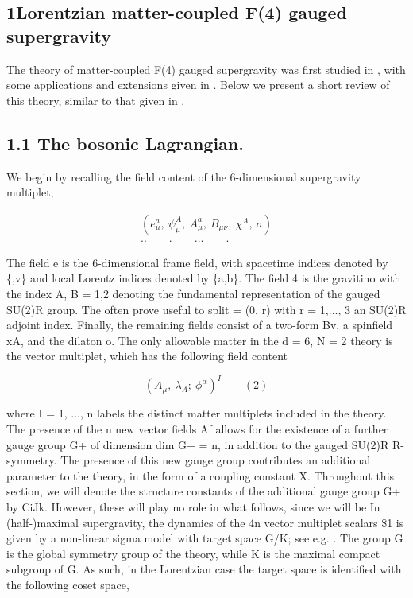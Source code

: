 \documentclass{article}
\begin{document}
\sloppy

\subsection*{1Lorentzian matter-coupled F(4) gauged supergravity}


The theory of matter-coupled F(4) gauged supergravity was first studied in , with some
applications and extensions given in . Below we present a short review of this theory, similar
to that given in .


\subsection*{1.1 The bosonic Lagrangian.}


We begin by recalling the field content of the 6-dimensional supergravity multiplet,


\begin{equation}
\begin{array} { c } { ( e _ { \mu } ^ { a }, ~ \psi _ { \mu } ^ { A }, ~ A _ { \mu } ^ { a }, ~ B _ { \mu \nu }, ~ \chi ^ { A }, ~ \sigma ) } \\ {.. \qquad. \qquad \dots \qquad. } \end{array}
\end{equation}


The field e is the 6-dimensional frame field, with spacetime indices denoted by \{,v\}
and local Lorentz indices denoted by \{a,b\}. The field 4 is the gravitino with the index
A, B = 1,2 denoting the fundamental representation of the gauged SU(2)R group. The
often prove useful to split  = (0, r) with r = 1,..., 3 an SU(2)R adjoint index. Finally, the
remaining fields consist of a two-form Bv, a spinfield xA, and the dilaton o. The only
allowable matter in the d = 6, N = 2 theory is the vector multiplet, which has the following
field content


\begin{equation}
( A _ { \mu }, ~ \lambda _ { A } ; ~ \phi ^ { \alpha } ) ^ { I } \qquad ( 2 )
\end{equation}


where I = 1, ..., n labels the distinct matter multiplets included in the theory. The presence
of the n new vector fields Af allows for the existence of a further gauge group G+ of dimension
dim G+ = n, in addition to the gauged SU(2)R R-symmetry. The presence of this new gauge
group contributes an additional parameter to the theory, in the form of a coupling constant
X. Throughout this section, we will denote the structure constants of the additional gauge
group G+ by CiJk. However, these will play no role in what follows, since we will be
In (half-)maximal supergravity, the dynamics of the 4n vector multiplet scalars \$1 is given
by a non-linear sigma model with target space G/K; see e.g. . The group G is the global
symmetry group of the theory, while K is the maximal compact subgroup of G. As such, in
the Lorentzian case the target space is identified with the following coset space,
\end{document}
